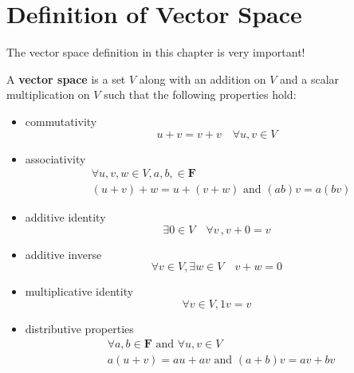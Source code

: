 \section{Definition of Vector Space}
\setcounter{exercise}{0}

The vector space definition in this chapter is very important!

\begin{definition}
  A \textbf{vector space} is a set $V$ along with an addition on $V$ and a scalar multiplication on $V$ such that the following properties hold:

  \begin{itemize}
    \item commutativity
          \begin{equation*}
            u + v = v+ v \quad\forall u, v \in V
          \end{equation*}
    \item associativity
          \begin{align*}
             & \forall u, v, w \in V, a, b, \in \mathbf{F}          \\
             & (u + v) + w = u + (v + w) \text{ and } (ab)v = a(bv)
          \end{align*}
    \item additive identity
          \begin{equation*}
            \exists 0 \in V \quad \forall v\,, v + 0 = v
          \end{equation*}
    \item additive inverse
          \begin{equation*}
            \forall v \in V, \exists w \in V \quad v + w = 0
          \end{equation*}
    \item multiplicative identity
          \begin{equation*}
            \forall v \in V, 1v =v
          \end{equation*}
    \item distributive properties
          \begin{align*}
             & \forall a, b \in \mathbf{F} \text{ and } \forall u, v \in V \\
             & a(u + v) = au + av \text{ and } (a+b)v = av + bv
          \end{align*}
  \end{itemize}
  \label{def:vector_space}
\end{definition}


